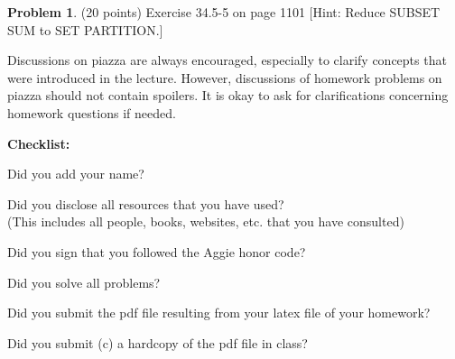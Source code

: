 \documentclass{article}
\theoremstyle{definition}
\newtheorem{problem}{Problem}
\newcommand{\checklist}{\noindent\textbf{Checklist:}
\begin{compactitem}[$\Box$] 
\item Did you add your name? 
\item Did you disclose all resources that you have used? \\
(This includes all people, books, websites, etc. that you have consulted)
\item Did you sign that you followed the Aggie honor code? 
\item Did you solve all problems? 
\item Did you submit the pdf file resulting from your latex file 
  of your homework?
\item Did you submit (c) a hardcopy of the pdf file in class? 
\end{compactitem}
}
\begin{document}
\begin{problem} (20 points) %
Exercise 34.5-5 on page 1101 [Hint: Reduce SUBSET SUM
to SET PARTITION.] 
\end{problem}

Discussions on piazza are always encouraged, especially to clarify
concepts that were introduced in the lecture. However, discussions of
homework problems on piazza should not contain spoilers. It is okay to
ask for clarifications concerning homework questions if needed. 
\medskip



\goodbreak
\checklist
\end{document}

